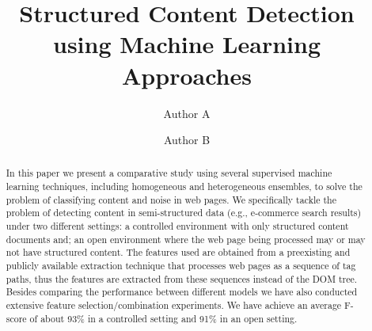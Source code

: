 \documentclass[sigconf]{acmart}
\begin{document}



\title{Structured Content Detection using Machine Learning Approaches}

%

\author{Author A}

\author{Author B}

\begin{abstract}
    In this paper we present a comparative study using several supervised 
    machine learning techniques, including homogeneous and heterogeneous
    ensembles, to solve the problem of classifying content and noise in web
    pages. We specifically tackle the problem of detecting content in 
    semi-structured data (e.g., e-commerce 
    search results) under two different
    settings: a controlled environment with only structured content documents
    and; an open environment where the web page being processed may or may
    not have structured content.
    The features used are obtained from a preexisting and publicly available extraction 
    technique that processes web pages as a sequence of tag paths, thus 
    the features are extracted from these sequences instead of the DOM 
    tree. Besides comparing the performance between different models 
    we have also conducted extensive feature selection/combination 
    experiments. We have achieve an average F-score of about
    93\% in a controlled setting and 91\% in an open setting.
\end{abstract}
\end{document}
